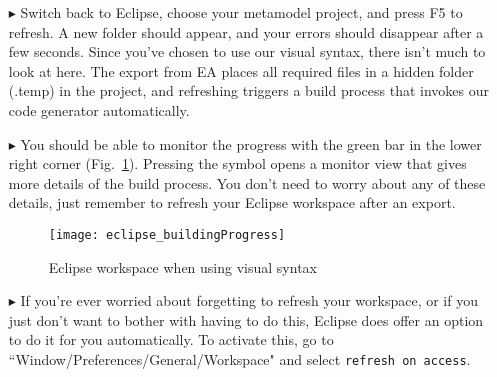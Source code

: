 \begin{itemize}
\item[$\blacktriangleright$] Switch back to Eclipse, choose your metamodel project, and press F5 to refresh. A new folder should appear, and your errors should
disappear after a few seconds. Since you've chosen to use our visual syntax, there isn't much to look at here. The export from EA places all required files in a
hidden folder (.temp) in the project, and refreshing triggers a build process that invokes our code generator automatically. 

\item[$\blacktriangleright$] You should be able to monitor the progress with the green bar in the lower right corner (Fig.~\ref{eclipse:build}). Pressing the
symbol opens a monitor view that gives more details of the build process. You don't need to worry about any of these details, just remember to refresh your
Eclipse workspace after an export.


\vspace{0.5cm}

\begin{figure}[htbp]
	\centering
  \texttt{[image: eclipse\_buildingProgress]}
	\caption{Eclipse workspace when using visual syntax} 
	\label{eclipse:build} 
\end{figure}

\vspace{0.5cm}

\item[$\blacktriangleright$] If you're ever worried about forgetting to refresh your workspace, or if you just don't want to bother with having to do this,
Eclipse does offer an option to do it for you automatically. To activate this, go to ``Window/Preferences/General/Workspace" and select \texttt{refresh on
access}.

\end{itemize}